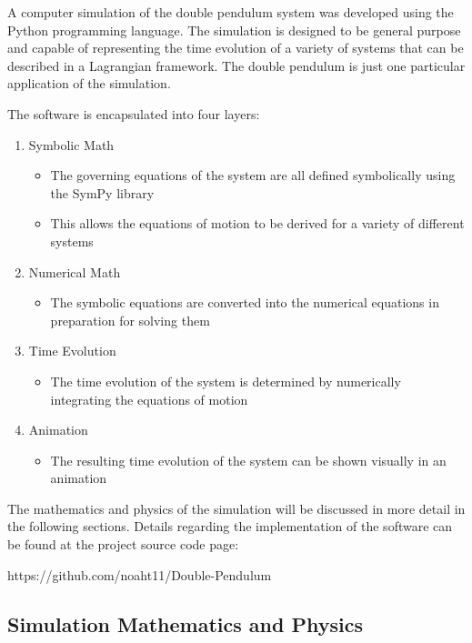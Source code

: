 A computer simulation of the double pendulum system was developed using the Python programming language. The simulation is designed to be general purpose and capable of representing the time evolution of a variety of systems that can be described in a Lagrangian framework. The double pendulum is just one particular application of the simulation.

The software is encapsulated into four layers:

\begin{enumerate}
    \item Symbolic Math
        \begin{itemize}
            \item The governing equations of the system are all defined symbolically using the SymPy library
            \item This allows the equations of motion to be derived for a variety of different systems
        \end{itemize}
    \item Numerical Math
        \begin{itemize}
            \item The symbolic equations are converted into the numerical equations in preparation for solving them
        \end{itemize}
    \item Time Evolution
        \begin{itemize}
            \item The time evolution of the system is determined by numerically integrating the equations of motion
        \end{itemize}
    \item Animation
        \begin{itemize}
            \item The resulting time evolution of the system can be shown visually in an animation
        \end{itemize}
\end{enumerate}

The mathematics and physics of the simulation will be discussed in more detail in the following sections. Details regarding the implementation of the software can be found at the project source code page:

https://github.com/noaht11/Double-Pendulum

\subsection{Simulation Mathematics and Physics}

